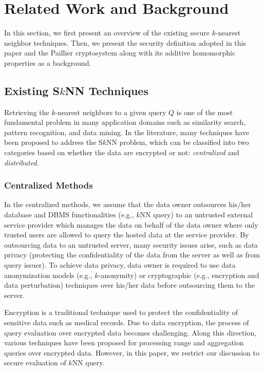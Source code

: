 \documentclass{article}
\begin{document}
\section{Related Work and Background}\label{sec:related-work}

In this section, we first present an overview of the existing secure $k$-nearest neighbor techniques. Then, we present 
the security definition adopted in this paper and the Paillier cryptosystem along with its additive 
homomorphic properties as a background. 
\subsection{Existing S$k$NN Techniques}
Retrieving the  $k$-nearest neighbors to a given query $Q$ is one of the most 
fundamental problem in many application domains such as similarity search, 
pattern recognition, and data mining. In the literature, many techniques 
have been proposed to address the S$k$NN problem, which can be classified into 
two categories based on whether the data are encrypted or not: \textit{centralized} and \textit{distributed}.
\subsubsection{Centralized Methods}
In the centralized methods, we assume that the data owner outsources his/her database and DBMS 
functionalities (e.g., $k$NN query) to an untrusted external service provider which 
manages the data on behalf of the data owner where only trusted users 
are allowed to query the hosted data at the service provider. 
By outsourcing data to an untrusted server, many security issues arise, 
such as data privacy (protecting the confidentiality of the data from 
the server as well as from query issuer). 
To achieve data privacy, data owner is required to use data anonymization models 
(e.g., $k$-anonymity) or cryptographic (e.g., encryption and data perturbation) techniques 
over his/her data before outsourcing them to the server.


Encryption is a traditional technique used to protect the confidentiality 
of sensitive data such as medical records. Due to data encryption, the process of 
query evaluation over encrypted data becomes challenging. 
Along this direction, various techniques have been proposed for processing range \cite{agrawal2004order,hore2004privacy,shi2007multi, hore2012secure} 
and aggregation queries \cite{hacigumucs2004efficient,mykletun2006aggregation} over encrypted data. 
However, in this paper, 
we restrict our discussion to secure evaluation of $k$NN query.
\end{document}
